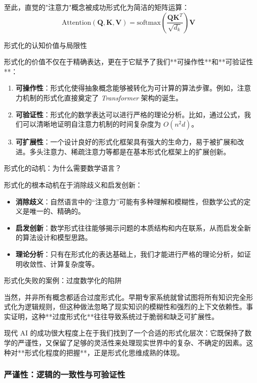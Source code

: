 至此，直觉的"注意力"概念被成功形式化为简洁的矩阵运算：
$$\text{Attention}(\mathbf{Q}, \mathbf{K}, \mathbf{V}) = \text{softmax}\left(\frac{\mathbf{Q}\mathbf{K}^T}{\sqrt{d_k}}\right)\mathbf{V}$$

形式化的认知价值与局限性

形式化的价值不仅在于精确表达，更在于它赋予了我们**可操作性**和**可验证性**：

\begin{enumerate}
\item \textbf{可操作性}：形式化使得抽象概念能够被转化为可计算的算法步骤。例如，注意力机制的形式化直接奠定了 \textit{Transformer} 架构的诞生。
\item \textbf{可验证性}：形式化的数学表达可以进行严格的理论分析。比如，通过公式，我们可以清晰地证明自注意力机制的时间复杂度为 $O(n^2 d)$。
\item \textbf{可扩展性}：一个设计良好的形式化框架具有强大的生命力，易于被扩展和改进。多头注意力、稀疏注意力等都是在基本形式化框架上的扩展创新。
\end{enumerate}

形式化的动机：为什么需要数学语言？

形式化的根本动机在于消除歧义和启发创新：

\begin{itemize}
\item \textbf{消除歧义}：自然语言中的“注意力”可能有多种理解和模糊性，但数学公式的定义是唯一的、精确的。
\item \textbf{启发创新}：数学形式往往能够揭示问题的本质结构和内在联系，从而启发全新的算法设计和模型思路。
\item \textbf{理论分析}：只有在形式化的表达基础上，我们才能进行严格的理论分析，如证明收敛性、计算复杂度等。
\end{itemize}

形式化失败的案例：过度数学化的陷阱

当然，并非所有概念都适合过度形式化。早期专家系统就曾试图将所有知识完全形式化为逻辑规则，但这种做法忽略了现实知识的模糊性和强烈的上下文依赖性。事实证明，这种**过度形式化**往往导致系统过于脆弱和缺乏可扩展性。

现代 AI 的成功很大程度上在于我们找到了一个合适的形式化层次：它既保持了数学的严谨性，又保留了足够的灵活性来处理现实世界中的复杂、不确定的因素。这种对**形式化程度的把握**，正是形式化思维成熟的体现。

\subsubsection{严谨性：逻辑的一致性与可验证性}

